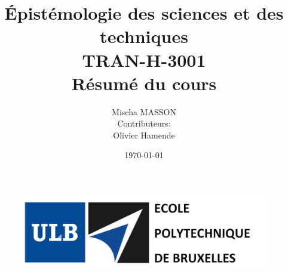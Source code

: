 \documentclass{report}
\title{\Huge \textbf{\'{E}pistémologie des sciences et des techniques}\\
	\Large TRAN-H-3001\\
	Résumé du cours}
\date{\today}
\author{Mischa MASSON\\
	Contributeurs:\\
	Olivier Hamende
	}
\begin{document}
	
	\begin{figure}[t]
		\includegraphics[width=15cm]{entete.PNG}
	\end{figure}
	
	\maketitle
	
	\renewcommand{\abstractname}{\og Synthèses, Open Source et contributions\fg, Mischa Masson\\ Université Libre de Bruxelles\\2015-2016.}
	
	\BgThispage
	
\end{document}
